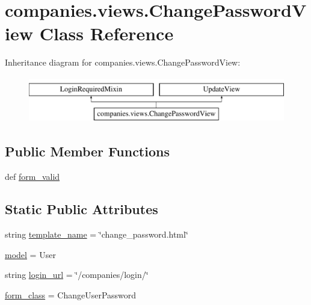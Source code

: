 \hypertarget{classcompanies_1_1views_1_1_change_password_view}{\section{companies.\-views.\-Change\-Password\-View Class Reference}
\label{classcompanies_1_1views_1_1_change_password_view}
}
Inheritance diagram for companies.\-views.\-Change\-Password\-View\-:\begin{figure}[H]
\begin{center}
\leavevmode
\includegraphics[height=2.000000cm]{classcompanies_1_1views_1_1_change_password_view}
\end{center}
\end{figure}
\subsection*{Public Member Functions}
\begin{DoxyCompactItemize}
\item 
def \hyperlink{classcompanies_1_1views_1_1_change_password_view_ad9f8d059bb887d9f6525a7613ef3283e}{form\-\_\-valid}
\end{DoxyCompactItemize}
\subsection*{Static Public Attributes}
\begin{DoxyCompactItemize}
\item 
string \hyperlink{classcompanies_1_1views_1_1_change_password_view_ad461893cb0cb7754f7493bdd2ab9ee15}{template\-\_\-name} = \char`\"{}change\-\_\-password.\-html\char`\"{}
\item 
\hyperlink{classcompanies_1_1views_1_1_change_password_view_a564bbd3a310f80714fbf52c84b084f03}{model} = User
\item 
string \hyperlink{classcompanies_1_1views_1_1_change_password_view_a6aae41c3fc842f9d205809535c081692}{login\-\_\-url} = \char`\"{}/companies/login/\char`\"{}
\item 
\hyperlink{classcompanies_1_1views_1_1_change_password_view_af07bafeceb83b99a2271274744533a43}{form\-\_\-class} = Change\-User\-Password
\end{DoxyCompactItemize}


